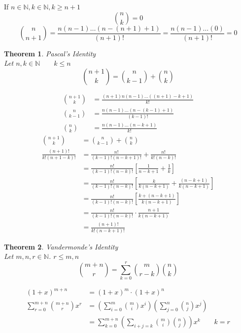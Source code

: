 \documentclass[letterpaper, 12pt]{article}
\newtheorem{theorem}{Theorem}[section]
\newenvironment{proof}[1][Proof]{\begin{trivlist}
\item[\hskip \labelsep {\bfseries #1}]}{\end{trivlist}}
\newenvironment{remark}[1][Remark]{\begin{trivlist}
\item[\hskip \labelsep {\bfseries #1}]}{\end{trivlist}}
\newcommand{\N}{\mathbb{N}}
\newcommand{\0}{\emptyset}
\begin{document}
    \begin{remark}
        If $n \in \N, k \in \N, k \ge n + 1$
        \[\binom{n}{k} = 0\]
        \[\binom{n}{n+1} = \frac{n(n-1)\dots(n-(n+1)+1)}{(n+1)!} 
        = \frac{n(n-1)\dots(0)}{(n+1)!} = 0\]
    \end{remark}
    \begin{theorem}
        Pascal's Identity \\
        Let $n, k \in \N \qquad k \le n$
        \[\binom{n+1}{k} = \binom{n}{k-1} + \binom{n}{k}\]
    \end{theorem}
    \begin{proof}
        \begin{align*}
            \binom{n+1}{k} &= \frac{(n+1)n(n-1)\dots((n+1)-k+1)}{k!} \\
            \binom{n}{k-1} &= \frac{n(n-1)\dots(n-(k-1)+1)}{(k-1)!} \\
            \binom{n}{k} &= \frac{n(n-1)\dots(n-k+1)}{k!}
        \end{align*}
        \begin{align*}
            \binom{n+1}{k} &= \binom{n}{k-1} + \binom{n}{k} \\
            \frac{(n+1)!}{k!(n+1-k)!} &= \frac{n!}{(k-1)!(n-k+1)!} + \frac{n!}{k!(n-k)!} \\
            &= \frac{n!}{(k-1)!(n-k)!} \left[\frac{1}{n-k+1}+\frac{1}{k}\right] \\
            &= \frac{n!}{(k-1)!(n-k)!} \left[\frac{k}{k(n-k+1)}+\frac{(n-k+1)}{k(n-k+1)}\right] \\
            &= \frac{n!}{(k-1)!(n-k)!} \left[\frac{k+(n-k+1)}{k(n-k+1)}\right] \\
            &= \frac{n!}{(k-1)!(n-k)!} \cdot \frac{n+1}{k(n-k+1)} \\
            &= \frac{(n+1)!}{k!(n-k+1)!}
        \end{align*}
    \end{proof}
    \begin{theorem}
        Vandermonde's Identity \\
        Let $m, n, r \in \N$. $r \le m, n$
        \[\binom{m+n}{r} = \sum_{k=0}^{r} \binom{m}{r-k} \binom{n}{k}\]
    \end{theorem}
    \begin{proof}
        \begin{align*}
            (1+x)^{m+n} &= (1+x)^m \cdot (1+x)^n \\
            \sum_{r=0}^{m+n} \binom{m+n}{r} x^r 
            &= \left(\sum_{i=0}^{m} \binom{m}{i} x^i\right)
            \left(\sum_{j=0}^{n} \binom{n}{j} x^j\right) \\
            &= \sum_{k=0}^{m+n} \left(\sum_{i+j=k} \binom{m}{i}\binom{n}{j}\right) x^k
            \qquad k = r
        \end{align*}
    \end{proof}
\end{document}
